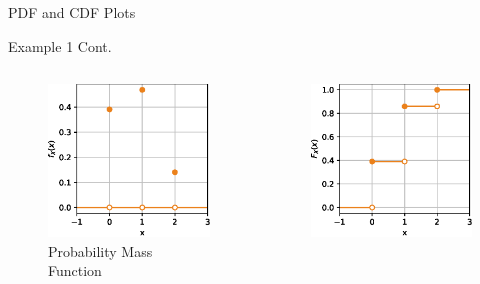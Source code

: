 \documentclass[10pt]{beamer}
\begin{document}
\begin{frame}[fragile]{PDF and CDF Plots}
\begin{exampleblock}{Example 1 Cont.}
\begin{columns}
\begin{column}{0.425\textwidth}
\begin{figure}
    \centering
    \includegraphics[width=\textwidth]{pmf.eps}
    \caption{Probability Mass Function}
\end{figure}
\end{column}
\begin{column}{0.425\textwidth}
\begin{figure}
    \centering
    \includegraphics[width=\textwidth]{cdf.eps}

\end{figure}
\end{column}
\end{columns}
\end{exampleblock}
\end{frame}
\end{document}

